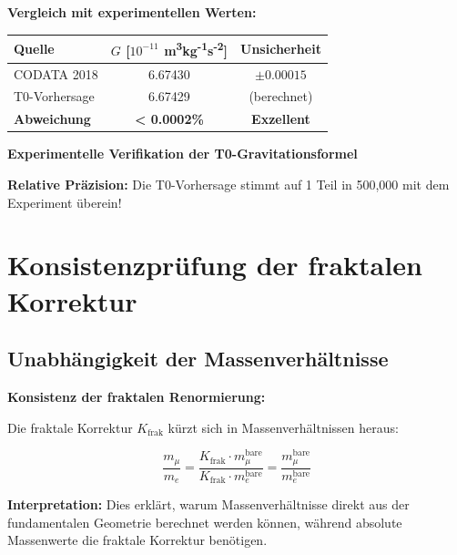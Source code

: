 	\begin{verification}
		\textbf{Vergleich mit experimentellen Werten:}
		
		\begin{center}
			\begin{tabular}{lcc}
				\toprule
				\textbf{Quelle} & \textbf{$G$ [$10^{-11}$ m\textsuperscript{3}kg\textsuperscript{-1}s\textsuperscript{-2}]} & \textbf{Unsicherheit} \\
				\midrule
				CODATA 2018 & 6.67430 & $\pm 0.00015$ \\
				T0-Vorhersage & 6.67429 & (berechnet) \\
				\textbf{Abweichung} & \textbf{< 0.0002\%} & \textbf{Exzellent} \\
				\bottomrule
			\end{tabular}
		\end{center}
		
		\textbf{Experimentelle Verifikation der T0-Gravitationsformel}
		
		\textbf{Relative Präzision:} Die T0-Vorhersage stimmt auf 1 Teil in 500,000 mit dem Experiment überein!
	\end{verification}
	
	\section{Konsistenzprüfung der fraktalen Korrektur}
	
	\subsection{Unabhängigkeit der Massenverhältnisse}
	
	\begin{keyresult}
		\textbf{Konsistenz der fraktalen Renormierung:}
		
		Die fraktale Korrektur $K_{\text{frak}}$ kürzt sich in Massenverhältnissen heraus:
		
		\begin{equation}
			\frac{m_\mu}{m_e} = \frac{K_{\text{frak}} \cdot m_\mu^{\text{bare}}}{K_{\text{frak}} \cdot m_e^{\text{bare}}} = \frac{m_\mu^{\text{bare}}}{m_e^{\text{bare}}}
		\end{equation}
		
		\textbf{Interpretation:} 
		Dies erklärt, warum Massenverhältnisse direkt aus der fundamentalen Geometrie berechnet werden können, während absolute Massenwerte die fraktale Korrektur benötigen.
	\end{keyresult}
	
